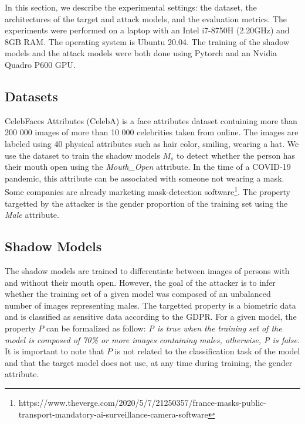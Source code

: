 \documentclass[11pt]{article}
\begin{document}
In this section, we describe the experimental settings: the dataset, the architectures of the target and attack models, and the evaluation metrics. The experiments were performed on a laptop with an Intel i7-8750H (2.20GHz) and 8GB RAM. The operating system is Ubuntu 20.04. The training of the shadow models and the attack models were both done using Pytorch and an Nvidia Quadro P600 GPU.\\

\subsection{Datasets}

CelebFaces Attributes (CelebA) \cite{liu2015faceattributes} is a face attributes dataset containing more than 200 000 images of more than 10 000 celebrities taken from online. The images are labeled using 40 physical attributes such as hair color, smiling, wearing a hat. We use the dataset to train the shadow models $M_s$ to detect whether the person has their mouth open using the \textit{Mouth\_Open} attribute. In the time of a COVID-19 pandemic, this attribute can be associated with someone not wearing a mask. Some companies are already marketing mask-detection software\footnote{https://www.theverge.com/2020/5/7/21250357/france-masks-public-transport-mandatory-ai-surveillance-camera-software}. The property targetted by the attacker is the gender proportion of the training set using the \textit{Male} attribute.\\

\subsection{Shadow Models}
The shadow models are trained to differentiate between images of persons with and without their mouth open.
However, the goal of the attacker is to infer whether the training set of a given model was composed of an unbalanced number of images representing males. The targetted property is a biometric data and is classified as sensitive data according to the GDPR. For a given model, the property $P$ can be formalized as follow: \textit{P is true when the training set of the model is composed of 70\% or more images containing males, otherwise, P is false}. It is important to note that $P$ is not related to the classification task of the model and that the target model does not use, at any time during training, the gender attribute.\\
\end{document}
